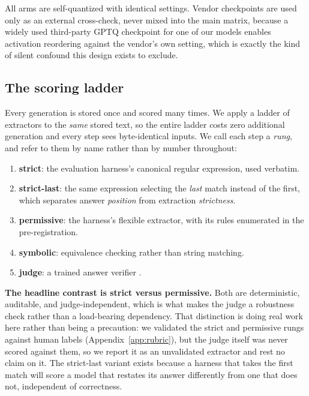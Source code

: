 \documentclass[11pt]{article}
\begin{document}
All arms are self-quantized with identical settings. Vendor checkpoints are used
only as an external cross-check, never mixed into the main matrix, because a
widely used third-party GPTQ checkpoint for one of our models enables activation
reordering against the vendor's own setting, which is exactly the kind of silent
confound this design exists to exclude.

\subsection{The scoring ladder}
\label{sec:ladder}
Every generation is stored once and scored many times. We apply a ladder of
extractors to the \emph{same} stored text, so the entire ladder costs zero
additional generation and every step sees byte-identical inputs. We call each step a
\emph{rung}, and refer to them by name rather than by number throughout:

\begin{enumerate}\itemsep0pt
  \item \textbf{strict}: the evaluation harness's canonical regular
    expression, used verbatim.
  \item \textbf{strict-last}: the same expression selecting the
    \emph{last} match instead of the first, which separates answer
    \emph{position} from extraction \emph{strictness}.
  \item \textbf{permissive}: the harness's flexible extractor, with its rules
    enumerated in the pre-registration.
  \item \textbf{symbolic}: equivalence checking rather than string matching.
  \item \textbf{judge}: a trained answer verifier \citep{chen2025xverify}.
\end{enumerate}

\textbf{The headline contrast is strict versus permissive.} Both are deterministic,
auditable, and judge-independent, which is what makes the judge a robustness check
rather than a load-bearing dependency. That distinction is doing real work here rather
than being a precaution: we validated the strict and permissive rungs against human
labels (Appendix~\ref{app:rubric}), but the judge itself was never scored against them, so
we report it as an unvalidated extractor and rest no claim on it. The strict-last variant exists because a harness that takes the first match will
score a model that restates its answer differently from one that does not,
independent of correctness.
\end{document}

